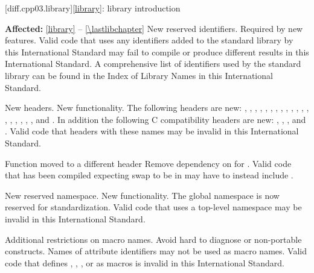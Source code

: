 [diff.cpp03.library]{\ref{library}: library introduction}

\pnum
\textbf{Affected:} \ref{library} -- \ref{\lastlibchapter}
\change
New reserved identifiers.
\rationale
Required by new features.
\effect
Valid \CppIII{} code that uses any identifiers added to the \Cpp{} standard
library by this International Standard may fail to compile or produce different
results in this International Standard. A comprehensive list of identifiers used
by the \Cpp{} standard library can be found in the Index of Library Names in this
International Standard.

\change
New headers.
\rationale
New functionality.
\effect
The following \Cpp{} headers are new:
,
,
,
,
,
,
,
,
,
,
,
,
,
,
,
,
,
,
,
and
.
In addition the following C compatibility headers are new:
,
,
,
and
.
Valid \CppIII{} code that  headers with these names may be
invalid in this International Standard.

\effect
Function  moved to a different header
\rationale
Remove dependency on  for .
\effect
Valid \CppIII{} code that has been compiled expecting swap to be in
 may have to instead include .

\change
New reserved namespace.
\rationale
New functionality.
\effect
The global namespace  is now reserved for standardization. Valid
\CppIII{} code that uses a top-level namespace  may be invalid in
this International Standard.

\change
Additional restrictions on macro names.
\rationale
Avoid hard to diagnose or non-portable constructs.
\effect
Names of attribute identifiers may not be used as macro names. Valid \CppIII{}
code that defines , ,
, or  as macros is invalid in this
International Standard.

